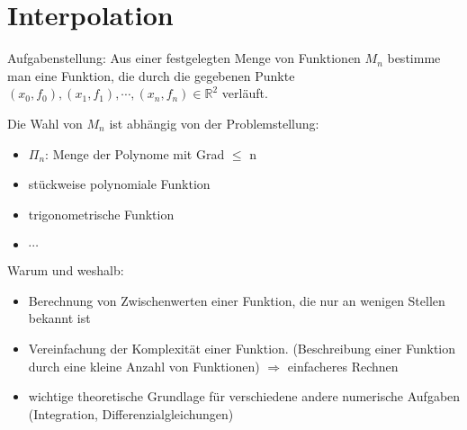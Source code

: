 \section{Interpolation}
Aufgabenstellung: Aus einer festgelegten Menge von Funktionen $M_n$ 
bestimme man eine Funktion, die durch die gegebenen Punkte
$(x_0, f_0), (x_1, f_1), \cdots, (x_n, f_n) \in \mathbb{R}^2$ verläuft.

Die Wahl von $M_n$ ist abhängig von der Problemstellung:
\begin{itemize}
  \item $\Pi_n$: Menge der Polynome mit Grad $\leq$ n
  \item stückweise polynomiale Funktion
  \item trigonometrische Funktion
	\item $\cdots$
\end{itemize}
Warum und weshalb:
\begin{itemize}
  \item Berechnung von Zwischenwerten einer Funktion, die nur an wenigen 
    Stellen bekannt ist
  \item Vereinfachung der Komplexität einer Funktion. (Beschreibung
    einer Funktion durch eine kleine Anzahl von Funktionen) $\Rightarrow$
    einfacheres Rechnen
  \item wichtige theoretische Grundlage für verschiedene andere numerische
    Aufgaben (Integration, Differenzialgleichungen)
\end{itemize}

